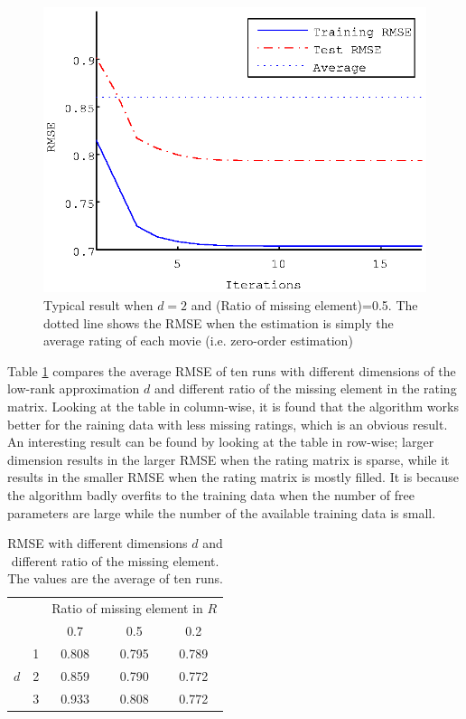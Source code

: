 \documentclass{article}
\begin{document}
\begin{figure}[ht]
  \begin{center}
    \includegraphics[scale=0.6]{figure/lrem_typical_plot}
  \end{center}
  \caption{Typical result when $d = 2$ and (Ratio of missing element)=0.5. The dotted line shows the RMSE when the estimation is simply the average rating of each movie (i.e. zero-order estimation)}
  \label{fig:lrem_typical_plot}
\end{figure}

Table \ref{table:lrem_result} compares the average RMSE of ten runs with different dimensions of the low-rank approximation $d$ and different ratio of the missing element in the rating matrix. Looking at the table in column-wise, it is found that the algorithm works better for the raining data with less missing ratings, which is an obvious result. An interesting result can be found by looking at the table in row-wise; larger dimension results in the larger RMSE when the rating matrix is sparse, while it results in the smaller RMSE when the rating matrix is mostly filled. It is because the algorithm badly overfits to the training data when the number of free parameters are large while the number of the available training data is small. 


\begin{table}[ht]
 \caption{RMSE with different dimensions $d$ and different ratio of the missing element. The values are the average of ten runs.}
 \label{table:lrem_result}
 \begin{center}
  \begin{tabular}{|c|c||c|c|c|}
    \hline
    \multicolumn{2}{|c|}{}  & \multicolumn{3}{|c|}{Ratio of missing element in $R$} \\
    \cline{3-5}
     \multicolumn{2}{|c|}{}    &  0.7  &  0.5  & 0.2   \\
    \hline
    \hline
       & 1 &  0.808  &  0.795  &  0.789  \\
    \cline{2-5}
     $d$ & 2 &  0.859  &  0.790  & 0.772   \\
    \cline{2-5}
     & 3 &  0.933  &  0.808  &  0.772  \\
    \hline
  \end{tabular}
 \end{center}
\end{table}
\end{document}

